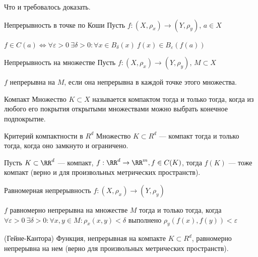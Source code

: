 Что и требовалось доказать.

\begin{defn}{Непрерывность в точке по Коши}{}
    Пусть \( f : (X, \rho_x) \to (Y, \rho_y) \), \( a \in X \)

    \( f \in C(a) \Leftrightarrow \forall \varepsilon > 0 \: \exists \delta > 0 : \forall x \in B_{\delta} (x) \: f(x) \in B_{\varepsilon} (f(a)) \)
\end{defn}

\begin{defn}{Непрерывность на множестве}{}
    Пусть \( f : (X, \rho_x) \to (Y, \rho_y) \), \( M \subset X \)

    \( f \) непрерывна на \( M \),
    если она непрерывна в каждой точке этого множества.
\end{defn}

\newpage

\begin{defn}{Компакт}{}
    Множество \( K \subset X \) называется компактом тогда и только тогда,
    когда из любого его покрытия открытыми множествами можно выбрать конечное подпокрытие.
\end{defn}

\begin{thrm}{Критерий компактности в \( R^d \)}{}
    Множество \( K \subset R^d \) --- компакт тогда и только тогда,
    когда оно замкнуто и ограничено.
\end{thrm}

\begin{thrm}{}{}
    Пусть \( K \subset \RR^d \) --- компакт, \( f : \RR^d \to \RR^m, f \in C(K) \),
    тогда \( f(K) \) --- тоже компакт (верно и для произвольных метрических пространств).
\end{thrm}

\begin{defn}{Равномерная непрерывность}{}
    \( f : (X, \rho_x) \to (Y, \rho_y) \)

    \( f \) равномерно непрерывна на множестве \( M \) тогда и только тогда,
    когда \( \forall \varepsilon > 0 \: \exists \delta > 0 : \forall x, y \in M : \rho_x(x, y) < \delta \)
    выполнено \( \rho_y (f(x), f(y)) < \varepsilon \)
\end{defn}

\begin{thrm}{(Гейне-Кантора)}{}
    Функция, непрерывная на компакте \( K \subset R^d \), равномерно непрерывна на нем
    (верно для произвольных метрических пространств).
\end{thrm}

